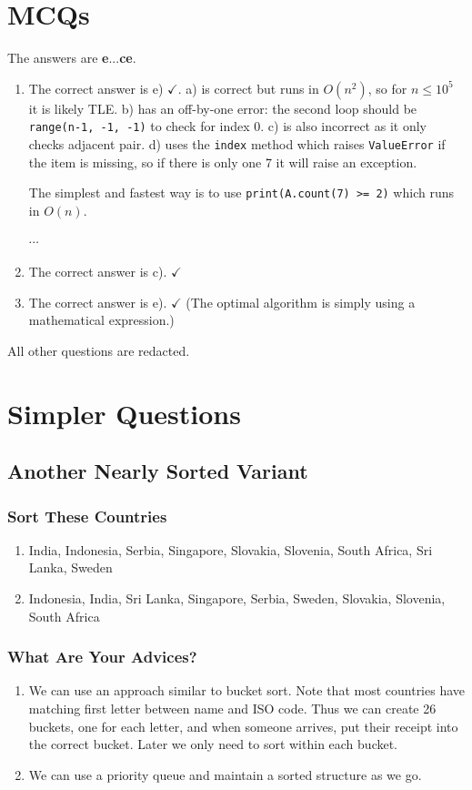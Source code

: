\documentclass[12pt]{article}
\renewcommand{\t}{\texttt}
\begin{document}
\section{MCQs}
The answers are \textbf{e}...\textbf{ce}.
\begin{enumerate}
\item The correct answer is e) $\checkmark$. a) is correct but runs in $O\left(n^2\right)$, so for $n\le 10^5$ it is likely TLE. b) has an off-by-one error: the second loop should be \t{range(n-1, -1, -1)} to check for index 0. c) is also incorrect as it only checks adjacent pair. d) uses the \t{index} method which raises \t{ValueError} if the item is missing, so if there is only one 7 it will raise an exception.

The simplest and fastest way is to use \t{print(A.count(7) >= 2)} which runs in $O(n)$.

$\cdots$
\setcounter{enumi}{18}
\item The correct answer is c). $\checkmark$
\item The correct answer is e). $\checkmark$ (The optimal algorithm is simply using a mathematical expression.)
\end{enumerate}
All other questions are redacted.
\section{Simpler Questions}
\subsection{Another Nearly Sorted Variant}
\subsubsection{Sort These Countries}
\begin{enumerate}
\item India, Indonesia, Serbia, Singapore, Slovakia, Slovenia, South Africa, Sri Lanka, Sweden
\item Indonesia, India, Sri Lanka, Singapore, Serbia, Sweden, Slovakia, Slovenia, South Africa
\end{enumerate}
\subsubsection{What Are Your Advices?}
\begin{enumerate}
\item We can use an approach similar to bucket sort. Note that most countries have matching first letter between name and ISO code. Thus we can create 26 buckets, one for each letter, and when someone arrives, put their receipt into the correct bucket. Later we only need to sort within each bucket.
\item We can use a priority queue and maintain a sorted structure as we go.
\end{enumerate}
\end{document}
